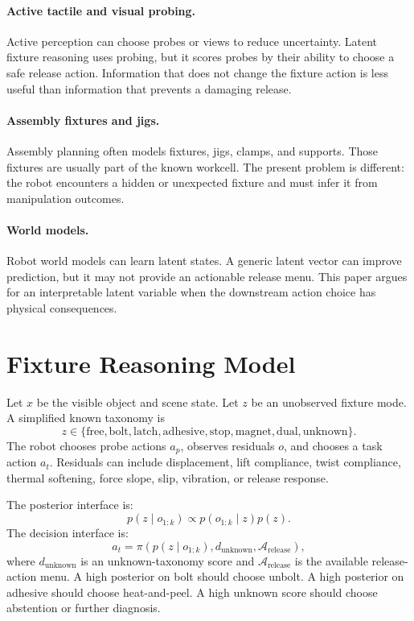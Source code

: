 \documentclass{article}
\begin{document}
\paragraph{Active tactile and visual probing.}
Active perception can choose probes or views to reduce uncertainty. Latent
fixture reasoning uses probing, but it scores probes by their ability to choose
a safe release action. Information that does not change the fixture action is
less useful than information that prevents a damaging release.

\paragraph{Assembly fixtures and jigs.}
Assembly planning often models fixtures, jigs, clamps, and supports. Those
fixtures are usually part of the known workcell. The present problem is
different: the robot encounters a hidden or unexpected fixture and must infer
it from manipulation outcomes.

\paragraph{World models.}
Robot world models can learn latent states. A generic latent vector can improve
prediction, but it may not provide an actionable release menu. This paper
argues for an interpretable latent variable when the downstream action choice
has physical consequences.

\section{Fixture Reasoning Model}

Let $x$ be the visible object and scene state. Let $z$ be an unobserved fixture
mode. A simplified known taxonomy is
\[
z \in \{\mathrm{free}, \mathrm{bolt}, \mathrm{latch},
\mathrm{adhesive}, \mathrm{stop}, \mathrm{magnet}, \mathrm{dual},
\mathrm{unknown}\}.
\]
The robot chooses probe actions $a_p$, observes residuals $o$, and chooses a
task action $a_t$. Residuals can include displacement, lift compliance, twist
compliance, thermal softening, force slope, slip, vibration, or release
response.

The posterior interface is:
\[
    p(z \mid o_{1:k}) \propto p(o_{1:k}\mid z)p(z).
\]
The decision interface is:
\[
    a_t =
    \pi\left(p(z\mid o_{1:k}), d_{\mathrm{unknown}},
    \mathcal{A}_{\mathrm{release}}\right),
\]
where $d_{\mathrm{unknown}}$ is an unknown-taxonomy score and
$\mathcal{A}_{\mathrm{release}}$ is the available release-action menu. A high
posterior on bolt should choose unbolt. A high posterior on adhesive should
choose heat-and-peel. A high unknown score should choose abstention or further
diagnosis.
\end{document}
